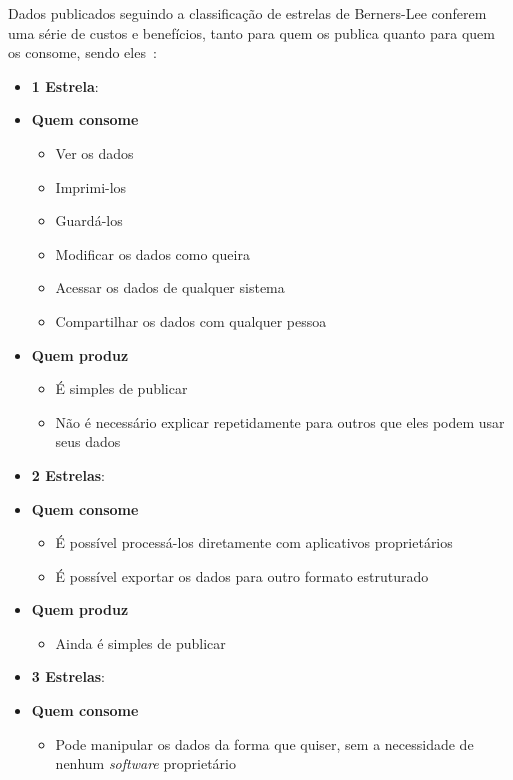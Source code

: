 Dados publicados seguindo a classificação de estrelas de Berners-Lee conferem uma série de custos e benefícios, tanto para quem os publica quanto para quem os consome, sendo eles~\cite{seijiconectados}:
\begin{itemize} 
\item \textbf{1 Estrela}: 
	\item[] \textbf{Quem consome}
		\begin{itemize}
			\itemsep0em
			\item Ver os dados
			\item Imprimi-los
			\item Guardá-los
			\item Modificar os dados como queira
			\item Acessar os dados de qualquer sistema
			\item Compartilhar os dados com qualquer pessoa			
		\end{itemize}
		
	\item[] \textbf{Quem produz}
		\begin{itemize}
			\itemsep0em
			\item É simples de publicar
			\item Não é necessário explicar repetidamente para outros que eles podem usar seus dados
		\end{itemize}
		
\item \textbf{2 Estrelas}:

	\item[] \textbf{Quem consome}
		\begin{itemize}
			\itemsep0em
			\item É possível processá-los diretamente com aplicativos proprietários 
			\item É possível exportar os dados para outro formato estruturado
		\end{itemize}
		
	\item[] \textbf{Quem produz}
		\begin{itemize}
			\itemsep0em
			\item Ainda é simples de publicar
		\end{itemize}

\item \textbf{3 Estrelas}:
	\item[] \textbf{Quem consome}
		\begin{itemize}
			\itemsep0em
			\item Pode manipular os dados da forma que quiser, sem a necessidade de nenhum \emph{software} proprietário	
		\end{itemize}
		

\end{itemize}
